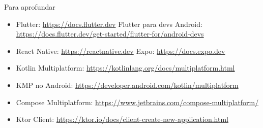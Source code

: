\documentclass[aspectratio=169,10pt]{beamer}
\begin{document}
\begin{frame}{Para aprofundar}
  \small
  \begin{itemize}
    \item Flutter: \url{https://docs.flutter.dev} \quad Flutter para devs Android: \url{https://docs.flutter.dev/get-started/flutter-for/android-devs}
    \item React Native: \url{https://reactnative.dev} \quad Expo: \url{https://docs.expo.dev}
    \item Kotlin Multiplatform: \url{https://kotlinlang.org/docs/multiplatform.html}
    \item KMP no Android: \url{https://developer.android.com/kotlin/multiplatform}
    \item Compose Multiplatform: \url{https://www.jetbrains.com/compose-multiplatform/}
    \item Ktor Client: \url{https://ktor.io/docs/client-create-new-application.html}
  \end{itemize}
\end{frame}

\end{document}
